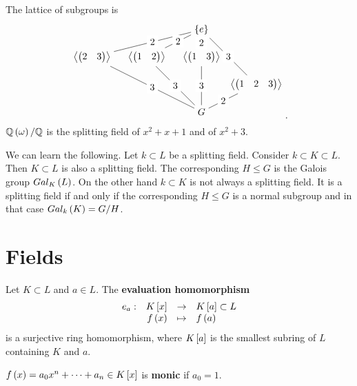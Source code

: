 \begin{example1}
$$\begin{array}{rrl}
\end{array}
$$
The lattice of subgroups is
$$
\begin{tikzpicture}
\node (E) at (0, 3) {$ \cb{e} $};
\node (K1) at (-4, 2) {$ \ab{\onebytwo{2}{3}} $};
\node (K2) at (-2, 2) {$ \ab{\onebytwo{1}{2}} $};
\node (K3) at (0, 2) {$ \ab{\onebytwo{1}{3}} $};
\node (K) at (2, 1) {$ \ab{\onebythree{1}{2}{3}} $};
\node (G) at (0, 0) {$ G $};
\draw (E) -- node[fill=white]{2} (K1) -- node[fill=white]{3} (G);
\draw (E) -- node[fill=white]{2} (K2) -- node[fill=white]{3} (G);
\draw (E) -- node[fill=white]{2} (K3) -- node[fill=white]{3} (G);
\draw (E) -- node[fill=white]{3} (K) -- node[fill=white]{2} (G);
\end{tikzpicture}.
$$
$ \Q\rb{\omega} / \Q $ is the splitting field of $ x^2 + x + 1 $ and of $ x^2 + 3 $.
\end{example1}

We can learn the following. Let $ k \subset L $ be a splitting field. Consider $ k \subset K \subset L $. Then $ K \subset L $ is also a splitting field. The corresponding $ H \le G $ is the Galois group $ Gal_K\rb{L} $. On the other hand $ k \subset K $ is not always a splitting field. It is a splitting field if and only if the corresponding $ H \le G $ is a normal subgroup and in that case $ Gal_k\rb{K} = G / H $.

\pagebreak

\section{Fields}


Let $ K \subset L $ and $ a \in L $. The \textbf{evaluation homomorphism}
$$ \function[e_a]{K\sb{x}}{K\sb{a} \subset L}{f\rb{x}}{f\rb{a}} $$
is a surjective ring homomorphism, where $ K\sb{a} $ is the smallest subring of $ L $ containing $ K $ and $ a $.

\begin{definition}
$ f\rb{x} = a_0x^n + \dots + a_n \in K\sb{x} $ is \textbf{monic} if $ a_0 = 1 $.
\end{definition}

